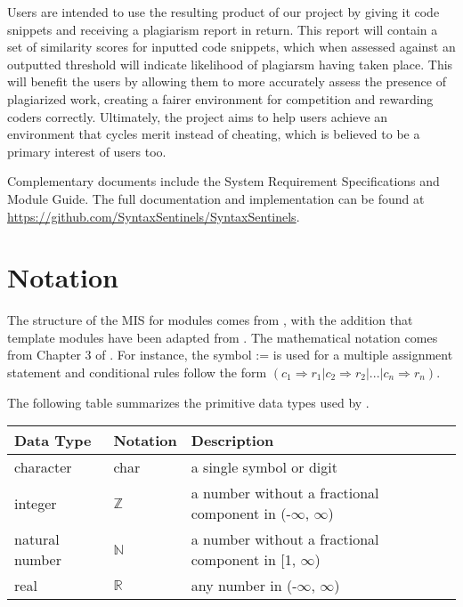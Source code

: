 \documentclass[12pt, titlepage]{article}
\begin{document}
Users are intended to use the resulting product of our project by giving
it code snippets and receiving a plagiarism report in return. This report
will contain a set of similarity scores for inputted code snippets, which when
assessed against an outputted threshold will indicate likelihood of plagiarsm
having taken place. This will benefit the users by allowing them to more accurately assess the presence of plagiarized work, 
creating a fairer environment for competition and rewarding coders correctly. 
Ultimately, the project aims to help users achieve an environment that cycles merit 
instead of cheating, which is believed to be a primary interest of users too.

Complementary documents include the System Requirement Specifications
and Module Guide.  The full documentation and implementation can be
found at \url{https://github.com/SyntaxSentinels/SyntaxSentinels}. 

\section{Notation}


The structure of the MIS for modules comes from \citet{HoffmanAndStrooper1995},
with the addition that template modules have been adapted from
\cite{GhezziEtAl2003}.  The mathematical notation comes from Chapter 3 of
\citet{HoffmanAndStrooper1995}.  For instance, the symbol := is used for a
multiple assignment statement and conditional rules follow the form $(c_1
\Rightarrow r_1 | c_2 \Rightarrow r_2 | ... | c_n \Rightarrow r_n )$.

The following table summarizes the primitive data types used by \progname. 

\begin{center}
\renewcommand{\arraystretch}{1.2}
\noindent 
\begin{tabular}{l l p{7.5cm}} 
\toprule 
\textbf{Data Type} & \textbf{Notation} & \textbf{Description}\\ 
\midrule
character & char & a single symbol or digit\\
integer & $\mathbb{Z}$ & a number without a fractional component in (-$\infty$, $\infty$) \\
natural number & $\mathbb{N}$ & a number without a fractional component in [1, $\infty$) \\
real & $\mathbb{R}$ & any number in (-$\infty$, $\infty$)\\
\bottomrule
\end{tabular} 
\end{center}
\end{document}
